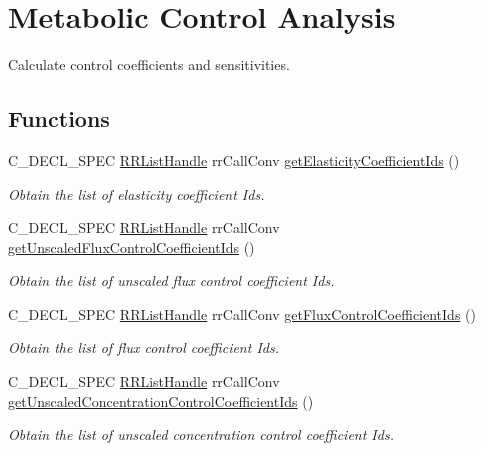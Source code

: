 \hypertarget{group__mca}{
\section{\-Metabolic \-Control \-Analysis}
\label{group__mca}
}


\-Calculate control coefficients and sensitivities.  


\subsection*{\-Functions}
\begin{DoxyCompactItemize}
\item 
\-C\-\_\-\-D\-E\-C\-L\-\_\-\-S\-P\-E\-C \hyperlink{rr__c__types_8h_a840005f5261fec71eec85cc770317c5d}{\-R\-R\-List\-Handle} rr\-Call\-Conv \hyperlink{group__mca_ga8fbef393d2135e8e553718fb1dc489ab}{get\-Elasticity\-Coefficient\-Ids} ()
\begin{DoxyCompactList}\small\item\em \-Obtain the list of elasticity coefficient \-Ids. \end{DoxyCompactList}\item 
\-C\-\_\-\-D\-E\-C\-L\-\_\-\-S\-P\-E\-C \hyperlink{rr__c__types_8h_a840005f5261fec71eec85cc770317c5d}{\-R\-R\-List\-Handle} rr\-Call\-Conv \hyperlink{group__mca_ga3a3ffa45b0188f017fb32473db3550f2}{get\-Unscaled\-Flux\-Control\-Coefficient\-Ids} ()
\begin{DoxyCompactList}\small\item\em \-Obtain the list of unscaled flux control coefficient \-Ids. \end{DoxyCompactList}\item 
\-C\-\_\-\-D\-E\-C\-L\-\_\-\-S\-P\-E\-C \hyperlink{rr__c__types_8h_a840005f5261fec71eec85cc770317c5d}{\-R\-R\-List\-Handle} rr\-Call\-Conv \hyperlink{group__mca_gae58c11a4b28e502a5f7c36bbd19e822d}{get\-Flux\-Control\-Coefficient\-Ids} ()
\begin{DoxyCompactList}\small\item\em \-Obtain the list of flux control coefficient \-Ids. \end{DoxyCompactList}\item 
\-C\-\_\-\-D\-E\-C\-L\-\_\-\-S\-P\-E\-C \hyperlink{rr__c__types_8h_a840005f5261fec71eec85cc770317c5d}{\-R\-R\-List\-Handle} rr\-Call\-Conv \hyperlink{group__mca_gae47e6ba33e42af8c6683878cdc05d508}{get\-Unscaled\-Concentration\-Control\-Coefficient\-Ids} ()
\begin{DoxyCompactList}\small\item\em \-Obtain the list of unscaled concentration control coefficient \-Ids. \end{DoxyCompactList}\item 

\end{DoxyCompactItemize}
